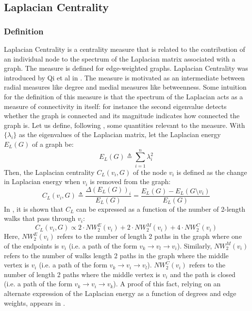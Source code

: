 \documentclass{article}
\begin{document}
\subsection{Laplacian Centrality}
\subsubsection{Definition}
Laplacian Centrality is a centrality measure that is related to the contribution of an individual node to the spectrum of the Laplacian matrix associated with a graph. The measure is defined for edge-weighted graphs. Laplacian Centrality was introduced by Qi et al in \cite{laplacian}. The measure is motivated as an intermediate between radial measures like degree and medial measures like betweenness. Some intuition for the definition of this measure is that the spectrum of the Laplacian acts as a measure of connectivity in itself: for instance the second eigenvalue detects whether the graph is connected and its magnitude indicates how connected the graph is. Let us define, following \cite{laplacian}, some quantities relevant to the measure. With $\{\lambda_i\}$ as the eigenvalues of the Laplacian matrix, let the Laplacian energy $E_L(G)$ of a graph be:
$$E_L(G) \triangleq \sum_{i=1}^n \lambda_i^2$$
Then, the Laplacian centrality $C_L(v_i, G)$ of the node $v_i$ is defined as the change in Laplacian energy when $v_i$ is removed from the graph:
$$C_L(v_i, G) \triangleq \frac{\Delta (E_L(G))_i}{E_L(G)} = \frac{E_L(G) - E_L(G \setminus v_i)}{E_L(G)}$$
In \cite{laplacian}, it is shown that $C_L$ can be expressed as a function of the number of 2-length walks that pass through $v_i$:
$$C_L(v_i,G) \propto 2\cdot NW_2^E(v_i) + 2 \cdot NW_2^M(v_i) + 4 \cdot NW_2^C(v_i)$$
Here, $NW_2^E(v_i)$ refers to the number of length 2 paths in the graph where one of the endpoints is $v_i$ (i.e. a path of the form $v_k \to v_l \to v_i$). Similarly, $NW_2^M(v_i)$ refers to the number of walks length 2 paths in the graph where the middle vertex is $v_i$ (i.e. a path of the form $v_k \to v_i \to v_l$). $NW_2^C(v_i)$ refers to the number of length 2 paths where the middle vertex is $v_i$ and the path is closed (i.e. a path of the form $v_k \to v_i \to v_k$). A proof of this fact, relying on an alternate expression of the Laplacian energy as a function of degrees and edge weights, appears in \cite{laplacian}. \\
\end{document}
